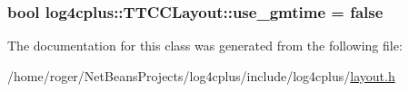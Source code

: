 \hypertarget{classlog4cplus_1_1TTCCLayout_a58ef0436c87f4ce6887903ff48747190}{
\subsubsection[{use\-\_\-gmtime}]{\setlength{\rightskip}{0pt plus 5cm}bool log4cplus\-::\-T\-T\-C\-C\-Layout\-::use\-\_\-gmtime = false\hspace{0.3cm}{\ttfamily [protected]}}}\label{classlog4cplus_1_1TTCCLayout_a58ef0436c87f4ce6887903ff48747190}


The documentation for this class was generated from the following file\-:\begin{DoxyCompactItemize}
\item 
/home/roger/\-Net\-Beans\-Projects/log4cplus/include/log4cplus/\hyperlink{layout_8h}{layout.\-h}\end{DoxyCompactItemize}
